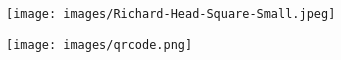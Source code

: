 \documentclass[10pt, letter]{article}
\newcommand{\cvqrcode}[1] {
    \texttt{[image: images/qrcode.png]}
}
\begin{document}



\setlength{\columnsep}{1em}
\setlength{\columnseprule}{1pt}

\begin{paracol}{2}
\begin{leftcolumn}
\texttt{[image: images/Richard-Head-Square-Small.jpeg]}

\vfill\null




\vfill\null
\cvqrcode{0.4}


\newpage




\newpage



\vfill\null




\end{leftcolumn}


\end{paracol}
\end{document}
